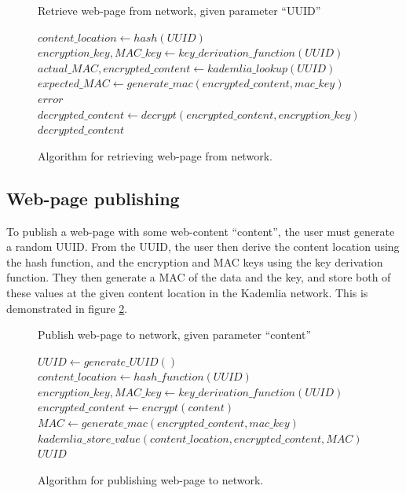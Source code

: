 \begin{figure}
    \begin{algorithm}[H]
    \caption{Retrieve web-page from network, given parameter ``UUID''}
    \begin{algorithmic}
        \STATE $content\_location \leftarrow hash(UUID)$
        \STATE $encryption\_key, MAC\_key \leftarrow key\_derivation\_function(UUID) $
        \STATE $actual\_MAC, encrypted\_content \leftarrow kademlia\_lookup(UUID) $
        \STATE $expected\_MAC \leftarrow generate\_mac(encrypted\_content, mac\_key) $
        \RETURN $ error $
        \ENDIF
        \STATE $ decrypted\_content \leftarrow decrypt(encrypted\_content, encryption\_key) $
        \RETURN $ decrypted\_content $
    \end{algorithmic}
    \end{algorithm}
    \caption{Algorithm for retrieving web-page from network.}
    \label{fig:retrievalalgo}
\end{figure}

\subsection{Web-page publishing}

To publish a web-page with some web-content ``content'', the user must generate a random UUID. From the UUID, the user
then derive the content location using the hash function, and the encryption and MAC keys using the key derivation function.
They then generate a MAC of the data and the key, and store both of these values at the given content location
in the Kademlia network. This is demonstrated in figure \ref{fig:publishalgo}.

\begin{figure}
    \begin{algorithm}[H]
        \caption{Publish web-page to network, given parameter ``content''}
        \begin{algorithmic}
        \STATE $ UUID \leftarrow generate\_UUID() $
        \STATE $ content\_location \leftarrow hash\_function(UUID) $
        \STATE $ encryption\_key, MAC\_key \leftarrow key\_derivation\_function(UUID) $
        \STATE $ encrypted\_content \leftarrow encrypt(content) $
        \STATE $ MAC \leftarrow generate\_mac(encrypted\_content, mac\_key) $
        \STATE $ kademlia\_store\_value(content\_location, encrypted\_content, MAC) $
        \RETURN $ UUID $
        \end{algorithmic}
    \end{algorithm}
    \caption{Algorithm for publishing web-page to network.}
    \label{fig:publishalgo}
\end{figure}

